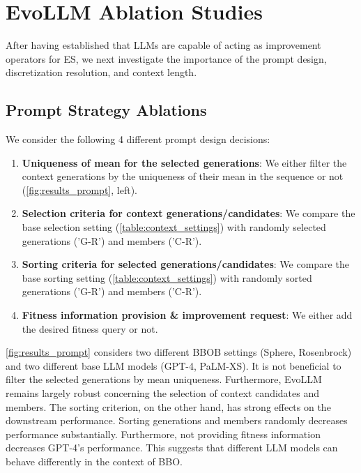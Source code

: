 \documentclass[sigconf]{acmart}
\begin{document}
\section{EvoLLM Ablation Studies}
After having established that LLMs are capable of acting as improvement operators for ES, we next investigate the importance of the prompt design, discretization resolution, and context length.
\subsection{Prompt Strategy Ablations}
We consider the following 4 different prompt design decisions:
\begin{enumerate}
\item \textbf{Uniqueness of mean for the selected generations}: We either filter the context generations by the uniqueness of their mean in the sequence or not (\cref{fig:results_prompt}, left).
\item \textbf{Selection criteria for context generations/candidates}: We compare the base selection setting (\cref{table:context_settings}) with randomly selected generations ('G-R') and members ('C-R').
\item \textbf{Sorting criteria for selected generations/candidates}: We compare the base sorting setting (\cref{table:context_settings}) with randomly sorted generations ('G-R') and members ('C-R').
\item \textbf{Fitness information provision \& improvement request}: We either add the desired fitness query or not.
\end{enumerate}
\cref{fig:results_prompt} considers two different BBOB settings (Sphere, Rosenbrock) and two different base LLM models (GPT-4, PaLM-XS). It is not beneficial to filter the selected generations by mean uniqueness. Furthermore, EvoLLM remains largely robust concerning the selection of context candidates and members. The sorting criterion, on the other hand, has strong effects on the downstream performance. Sorting generations and members randomly decreases performance substantially. Furthermore, not providing fitness information decreases GPT-4's performance. This suggests that different LLM models can behave differently in the context of BBO.
\end{document}

